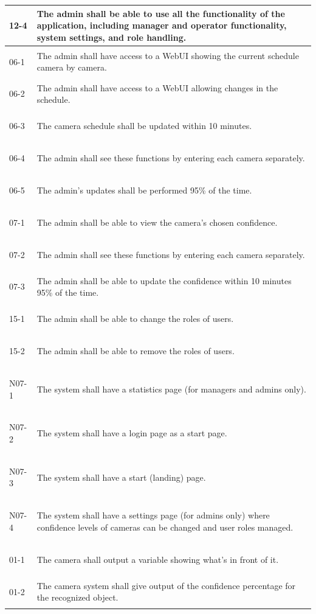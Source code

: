 \documentclass{article}
\begin{document}
\begin{longtable}{|l|p{15cm}|}
\hline
\hypertarget{12-4}{12-4} & The admin shall be able to use all the functionality of the application, including manager and operator functionality, system settings, and role handling. \\
\hline
\hypertarget{06-1}{06-1} & The admin shall have access to a WebUI showing the current schedule camera by camera. \\
\hline
\hypertarget{06-2}{06-2} & The admin shall have access to a WebUI allowing changes in the schedule. \\
\hline
\hypertarget{06-3}{06-3} & The camera schedule shall be updated within 10 minutes. \\
\hline
\hypertarget{06-4}{06-4} & The admin shall see these functions by entering each camera separately. \\
\hline
\hypertarget{06-5}{06-5} & The admin’s updates shall be performed 95\% of the time. \\
\hline
\hypertarget{07-1}{07-1} & The admin shall be able to view the camera’s chosen confidence. \\
\hline
\hypertarget{07-2}{07-2} & The admin shall see these functions by entering each camera separately. \\
\hline
\hypertarget{07-3}{07-3} & The admin shall be able to update the confidence within 10 minutes 95\% of the time. \\
\hline
\hypertarget{15-1}{15-1} & The admin shall be able to change the roles of users. \\
\hline
\hypertarget{15-2}{15-2} & The admin shall be able to remove the roles of users. \\
\hline
\hypertarget{N07-1}{N07-1} & The system shall have a statistics page (for managers and admins only). \\
\hline
\hypertarget{N07-2}{N07-2} & The system shall have a login page as a start page. \\
\hline
\hypertarget{N07-3}{N07-3} & The system shall have a start (landing) page. \\
\hline
\hypertarget{N07-4}{N07-4} & The system shall have a settings page (for admins only) where confidence levels of cameras can be changed and user roles managed. \\
\hline
\hypertarget{01-1}{01-1} & The camera shall output a variable showing what’s in front of it. \\
\hline
\hypertarget{01-2}{01-2} & The camera system shall give output of the confidence percentage for the recognized object. \\

\end{longtable}
\end{document}
